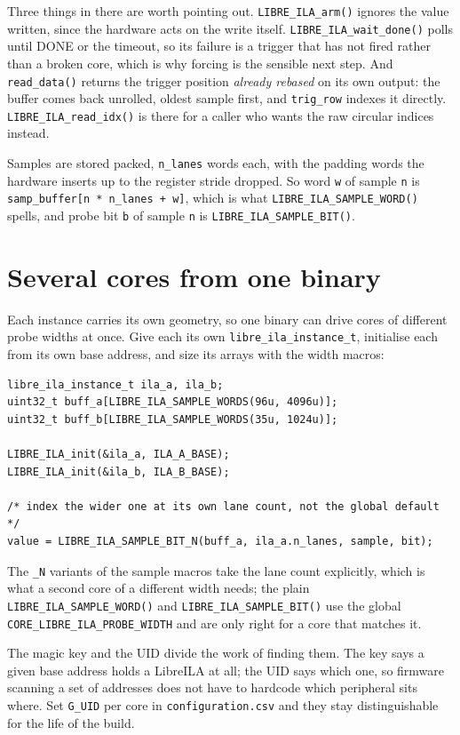 \documentclass[../manual.tex]{subfiles}
\begin{document}
Three things in there are worth pointing out. \texttt{LIBRE\_ILA\_arm()} ignores the value written, since the hardware acts on the write itself. \texttt{LIBRE\_ILA\_wait\_done()} polls until DONE or the timeout, so its failure is a trigger that has not fired rather than a broken core, which is why forcing is the sensible next step. And \texttt{read\_data()} returns the trigger position \emph{already rebased} on its own output: the buffer comes back unrolled, oldest sample first, and \texttt{trig\_row} indexes it directly. \texttt{LIBRE\_ILA\_read\_idx()} is there for a caller who wants the raw circular indices instead.

Samples are stored packed, \texttt{n\_lanes} words each, with the padding words the hardware inserts up to the register stride dropped. So word \texttt{w} of sample \texttt{n} is \texttt{samp\_buffer[n * n\_lanes + w]}, which is what \texttt{LIBRE\_ILA\_SAMPLE\_WORD()} spells, and probe bit \texttt{b} of sample \texttt{n} is \texttt{LIBRE\_ILA\_SAMPLE\_BIT()}.

\section{Several cores from one binary}
\label{sec:c_multi}

Each instance carries its own geometry, so one binary can drive cores of different probe widths at once. Give each its own \texttt{libre\_ila\_instance\_t}, initialise each from its own base address, and size its arrays with the width macros:

\begin{lstlisting}
libre_ila_instance_t ila_a, ila_b;
uint32_t buff_a[LIBRE_ILA_SAMPLE_WORDS(96u, 4096u)];
uint32_t buff_b[LIBRE_ILA_SAMPLE_WORDS(35u, 1024u)];

LIBRE_ILA_init(&ila_a, ILA_A_BASE);
LIBRE_ILA_init(&ila_b, ILA_B_BASE);

/* index the wider one at its own lane count, not the global default */
value = LIBRE_ILA_SAMPLE_BIT_N(buff_a, ila_a.n_lanes, sample, bit);
\end{lstlisting}

The \texttt{\_N} variants of the sample macros take the lane count explicitly, which is what a second core of a different width needs; the plain \texttt{LIBRE\_ILA\_SAMPLE\_WORD()} and \texttt{LIBRE\_ILA\_SAMPLE\_BIT()} use the global \texttt{CORE\_LIBRE\_ILA\_PROBE\_WIDTH} and are only right for a core that matches it.

The magic key and the UID divide the work of finding them. The key says a given base address holds a LibreILA at all; the UID says which one, so firmware scanning a set of addresses does not have to hardcode which peripheral sits where. Set \texttt{G\_UID} per core in \texttt{configuration.csv} and they stay distinguishable for the life of the build.
\end{document}
